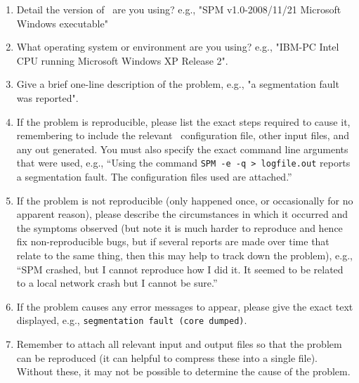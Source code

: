 \begin{enumerate}
\item Detail the version of \SPM\ are you using? e.g., "SPM v1.0-2008/11/21 Microsoft Windows executable"

\item What operating system or environment are you using? e.g., "IBM-PC Intel CPU running Microsoft Windows XP Release 2".

\item Give a brief one-line description of the problem, e.g., "a segmentation fault was reported".

\item If the problem is reproducible, please list the exact steps required to cause it, remembering to include the relevant \SPM\ configuration file, other input files, and any out generated. You must also specify the exact command line arguments that were used, e.g., ``Using the command \texttt{SPM -e -q > logfile.out} reports a segmentation fault. The configuration files used are attached.''

\item If the problem is not reproducible (only happened once, or occasionally for no apparent reason), please describe the circumstances in which it occurred and the symptoms observed (but note it is much harder to reproduce and hence fix non-reproducible bugs, but if several reports are made over time that relate to the same thing, then this may help to track down the problem), e.g., ``SPM crashed, but I cannot reproduce how I did it. It seemed to be related to a local network crash but I cannot be sure.''

\item If the problem causes any error messages to appear, please give the exact text displayed, e.g., \texttt{segmentation fault (core dumped)}.

\item Remember to attach all relevant input and output files so that the problem can be reproduced (it can helpful to compress these into a single file). Without these, it may not be possible to determine the cause of the problem.

\end{enumerate}
